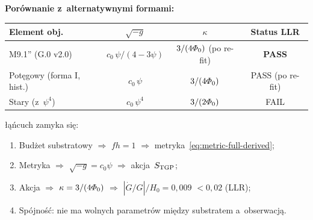\medskip
\noindent\textbf{Por\'ownanie z~alternatywnymi formami:}
\begin{center}
\renewcommand{\arraystretch}{1.3}
\begin{tabular}{l|c|c|c}
\toprule
Element obj. & $\sqrt{-g}$ & $\kappa$ & Status LLR \\
\midrule
M9.1'' (G.0 v2.0) & $c_0\,\psi/(4-3\psi)$ & $3/(4\varPhi_0)$ (po re-fit) & \textbf{PASS} \\
Pot\k{e}gowy (forma I, hist.) & $c_0\,\psi$ & $3/(4\varPhi_0)$ & PASS (po re-fit) \\
Stary (z~$\psi^4$) & $c_0\,\psi^4$ & $3/(2\varPhi_0)$ & FAIL \\
\bottomrule
\end{tabular}
\end{center}

\begin{remark}%
\label{rem:metric-action-consistency}
\l{}\k{a}\'ncuch zamyka si\k{e}:
\begin{enumerate}[nosep]
  \item Bud\.zet substratowy $\Rightarrow$ $fh = 1$
        $\Rightarrow$ metryka~\eqref{eq:metric-full-derived};
  \item Metryka $\Rightarrow$ $\sqrt{-g} = c_0\psi$
        $\Rightarrow$ akcja~$S_{\rm TGP}$;
  \item Akcja $\Rightarrow$ $\kappa = 3/(4\varPhi_0)$
        $\Rightarrow$ $|\dot G/G|/H_0 = 0{,}009$
        $< 0{,}02$ (LLR);
  \item Sp\'ojno\'s\'c: nie ma wolnych parametr\'ow mi\k{e}dzy
        substratem a~obserwacj\k{a}.
\end{enumerate}
\end{remark}
\fi

